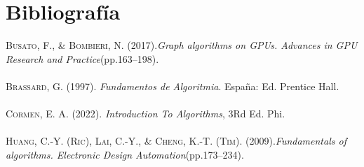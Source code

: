 \documentclass[12pt,twoside]{article}
\begin{document}
\section{Bibliograf\'ia}
\textsc{Busato, F., \& Bombieri, N.} (2017).\textit{Graph algorithms on GPUs. Advances in GPU Research and Practice}(pp.163–198).\\\\
\textsc{Brassard, G. (1997)}. \textit {Fundamentos de Algoritmia}. España: Ed. Prentice Hall.\\\\
\textsc{Cormen, E. A}. (2022). \textit{Introduction To Algorithms}, 3Rd Ed. Phi.\\\\
\textsc{Huang, C.-Y. (Ric), Lai, C.-Y., \& Cheng, K.-T. (Tim).} (2009).\textit{Fundamentals of algorithms. Electronic Design Automation}(pp.173–234).





\medskip
\end{document}
